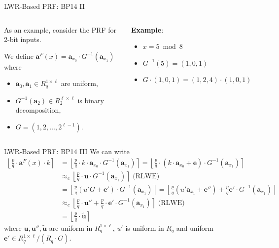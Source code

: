 \documentclass[xcolor=table,10pt,aspectratio=169]{beamer}
\begin{document}
\begin{frame}[label={sec:orgc9b1a06}]{LWR-Based PRF: BP14 II}
\begin{columns}[t]
\begin{column}{0.5\columnwidth}
As an example, consider the PRF for 2-bit inputs.

We define \(\mathbf{a}^F(x) = \mathbf{a}_{x_0} \cdot G^{-1}\left( \mathbf{a}_{x_1}\right)\)  where 

\begin{itemize}
\item \(\mathbf{a}_0, \mathbf{a}_1 \in R_q^{1\times \ell}\) are uniform,
\item \(G^{-1}\left( \mathbf{a}_2 \right) \in R_2^{\ell \times \ell}\) is binary decomposition,
\item \(G = (1,2,\dots, 2^{\ell-1})\).
\end{itemize}
\end{column}

\begin{column}{0.5\columnwidth}
\textbf{Example}:

\begin{itemize}
\item \(x = 5 \bmod 8\)
\item \(G^{-1}(5) = (1, 0, 1)\)
\item \(G \cdot (1, 0, 1) = (1, 2, 4) \cdot (1, 0, 1) = 1 + 4 = 5\)
\end{itemize}
\end{column}
\end{columns}
\end{frame}

\begin{frame}[label={sec:org8b297b0}]{LWR-Based PRF: BP14 III}
We can write 
\begin{align*}
\left\lfloor \frac{p}{q} \cdot \mathbf{a}^F(x) \cdot k \right\rceil &= \left\lfloor \frac{p}{q} \cdot k\cdot \mathbf{a}_{x_0} \cdot G^{-1}(\mathbf{a}_{x_1}) \right\rceil 
= \left\lfloor \frac{p}{q} \cdot (k\cdot \mathbf{a}_{x_0} + \mathbf{e})\cdot G^{-1}(\mathbf{a}_{x_1}) \right\rceil \\
&\approx_c \left\lfloor \frac{p}{q}\cdot\mathbf{u}\cdot G^{-1}(\mathbf{a}_{x_1}) \right\rceil \text{ (RLWE)}\\
&= \left\lfloor \frac{p}{q} (u'G+\mathbf{e}') \cdot G^{-1}(\mathbf{a}_{x_1}) \right\rceil = \left\lfloor \frac{p}{q} \left(u' \mathbf{a}_{x_1} + \mathbf{e}''\right) + \frac{p}{q} \mathbf{e}' \cdot G^{-1}(\mathbf{a}_{x_1}) \right\rceil \\ 
&\approx_c \left\lfloor \frac{p}{q} \cdot \mathbf{u}'' + \frac{p}{q} \cdot \mathbf{e}' \cdot G^{-1}(\mathbf{a}_{x_1}) \right\rceil \text{ (RLWE)} \\
& = \left\lfloor \frac{p}{q} \cdot \tilde{\mathbf{u}} \right\rceil
\end{align*}
where \(\mathbf{u}, \mathbf{u}'',  \tilde{\mathbf{u}}\) are uniform in \(R_q^{1 \times \ell}\), \(u'\) is uniform in \(R_q\) and  uniform \(\mathbf{e}' \in R_q^{1 \times \ell} / (R_q \cdot G)\).
\end{frame}
\end{document}
